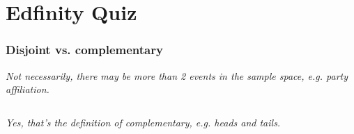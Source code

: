 \documentclass[slidestop,compress,mathserif]{beamer}
\newcommand{\soln}[1]{\textit{#1}}
\begin{document}

\section{Edfinity Quiz}


\begin{frame}
\frametitle{Disjoint vs. complementary}


\pause

\soln{Not necessarily, there may be more than 2 events in the sample space, e.g. party affiliation.}

\pause
$\:$ \\


\pause

\soln{Yes, that's the definition of complementary, e.g. heads and tails. }

\end{frame}
\end{document}
